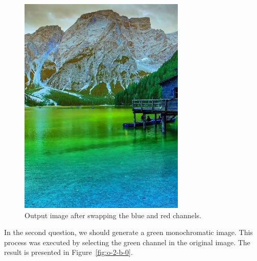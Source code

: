 \documentclass[]{IEEEtran}
\begin{document}
  \begin{figure}[!h]
    \centering
    \includegraphics[width=0.8\hsize]{../output/o-2-a-0.jpg}
    \caption{Output image after swapping the blue and red channels.}
    \label{fig:o-2-a-0}
  \end{figure}
  
  In the second question, we should generate a green monochromatic image. This process was executed by selecting the green channel in the original image. The result is presented in Figure~\ref{fig:o-2-b-0}.
  
\end{document}
